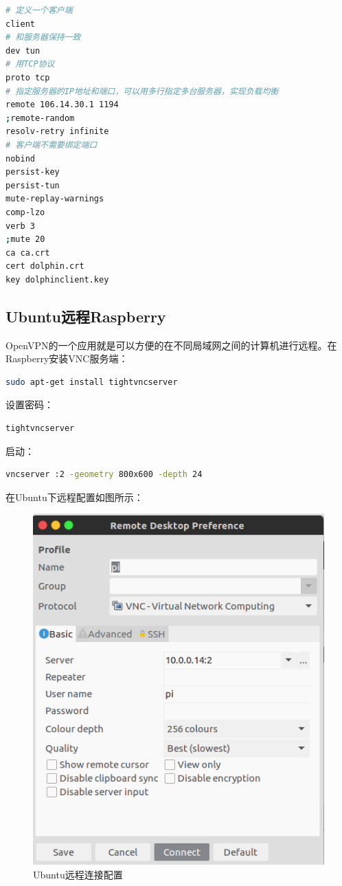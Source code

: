 \documentclass[letter]{book}
\begin{document}
\begin{lstlisting}[language=Bash]
# 定义一个客户端
client
# 和服务器保持一致
dev tun
# 用TCP协议
proto tcp
# 指定服务器的IP地址和端口，可以用多行指定多台服务器，实现负载均衡
remote 106.14.30.1 1194
;remote-random
resolv-retry infinite
# 客户端不需要绑定端口
nobind
persist-key
persist-tun
mute-replay-warnings
comp-lzo
verb 3
;mute 20
ca ca.crt
cert dolphin.crt
key dolphinclient.key
\end{lstlisting}


\subsection{Ubuntu远程Raspberry}

OpenVPN的一个应用就是可以方便的在不同局域网之间的计算机进行远程。在Raspberry安装VNC服务端：

\begin{lstlisting}[language=Bash]
sudo apt-get install tightvncserver
\end{lstlisting}

设置密码：

\begin{lstlisting}[language=Bash]
tightvncserver
\end{lstlisting}

启动：

\begin{lstlisting}[language=Bash]
vncserver :2 -geometry 800x600 -depth 24
\end{lstlisting}

在Ubuntu下远程配置如图\label{raspberryremtoeconfig}所示：

\begin{figure}[htbp]
	\centering
	\includegraphics[scale=0.4]{raspberryremtoeconfig.png}
	\caption{Ubuntu远程连接配置}
	\label{fig:raspberryremtoeconfig}
\end{figure}
\end{document}
